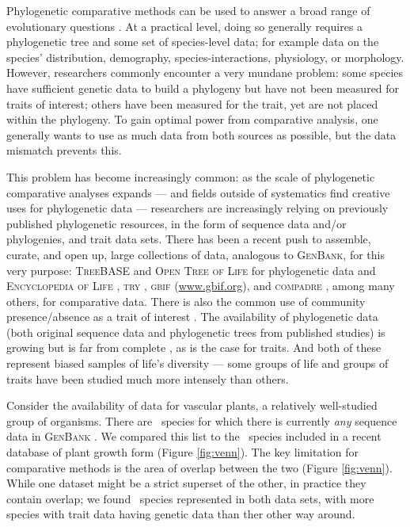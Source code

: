 \documentclass[a4paper,11pt]{article}
\begin{document}
Phylogenetic comparative methods can be used to answer a broad range of evolutionary questions \citep{omeara-2012, PennellHarmon}.  At a practical level, doing so generally requires a phylogenetic tree and some set of species-level data; for example data on the species' distribution, demography, species-interactions, physiology, or morphology. However, researchers commonly encounter a very mundane problem: some species have sufficient genetic data to build a phylogeny but have not been measured for traits of interest; others have been measured for the trait, yet are not placed within the phylogeny.  To gain optimal power from comparative analysis, one generally wants to use as much data from both sources as possible, but the data mismatch prevents this.

This problem has become increasingly common: as the scale of phylogenetic comparative analyses expands --- and fields outside of systematics find creative uses for phylogenetic data --- researchers are increasingly relying on previously published phylogenetic resources, in the form of sequence data and/or phylogenies, and trait data sets. There has been a recent push to assemble, curate, and open up, large collections of data, analogous to \textsc{GenBank}, for this very purpose: \textsc{TreeBASE} \citep{treebase} and \textsc{Open Tree of Life} \citep{OpenTree} for phylogenetic data and \textsc{Encyclopedia of Life} \citep{eol}, \textsc{try} \citep{try}, \textsc{gbif} (\url{www.gbif.org}), and \textsc{compadre} \citep{salguero2015}, among many others, for comparative data.  There is also the common use of community presence/absence as a trait of interest \citep{vellend2011measuring}.  The availability of phylogenetic data (both original sequence data and phylogenetic trees from published studies) is growing but is far from complete \citep{hinchliff2014}, as is the case for traits. And both of these represent biased samples of life's diversity --- some groups of life and groups of traits have been studied much more intensely than others.

Consider the availability of data for vascular plants, a relatively well-studied group of organisms. There are \ngenbank\ species for which there is currently \emph{any} sequence data in \textsc{GenBank} \citep[As of May 2015 --- accessed using the \textsc{ncbi taxonomy browser};][\url{http://www.ncbi.nlm.nih.gov/Taxonomy/Browser/wwwtax.cgi}]{ncbi-taxonomy}. We compared this list to the \nwoody\ species included in a recent database of plant growth form \citep{Zanne} (Figure \ref{fig:venn}). The key limitation for comparative methods is the area of overlap between the two (Figure \ref{fig:venn}).  While one dataset might be a strict superset of the other, in practice they contain overlap; we found \noverlap\ species represented in both data sets, with more species with trait data having genetic data than ther other way around.
\end{document}
